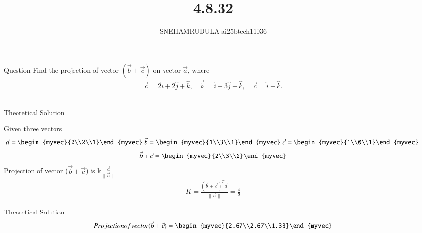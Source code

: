 \documentclass{beamer}
\title %
{4.8.32}
\author %
{SNEHAMRUDULA-ai25btech11036}
\begin{document}
\frame{\titlepage}
\begin{frame}{Question}
 Find the projection of vector $(\vec{b}+\vec{c})$ on vector $\vec{a}$, where 
\begin{align}
\vec{a} = 2\hat{i} + 2\hat{j} + \hat{k}, \quad 
\vec{b} = \hat{i} + 3\hat{j} + \hat{k}, \quad 
\vec{c} = \hat{i} + \hat{k}.
\end{align}\\ 
\end{frame}
\begin{frame}{Theoretical Solution}

Given three vectors\\
\begin{align}
\vec{a}=\begin{myvec}{2\\2\\1}\end{myvec}\
\vec{b}=\begin{myvec}{1\\3\\1}\end{myvec}\
\vec{c}=\begin{myvec}{1\\0\\1}\end{myvec}\
\end{align}
   \begin{align}
 \vec{b}+\vec{c}=\begin{myvec}{2\\3\\2}\end{myvec}
\end{align}
Projection of vector ($\vec{b}+\vec{c}$) is k$\frac{\vec{a}}{\|\vec{a}\|}$
\begin{align}
    K=\frac{(\vec{b}+\vec{c})^T\vec{a}}{\|\vec{a}\|}=\frac{4}{3}
\end{align}
\end{frame}
\begin{frame}{Theoretical Solution}
\begin{align}
Projection of vector (\vec{b}+\vec{c})=\begin{myvec}{2.67\\2.67\\1.33}\end{myvec}    
\end{align}
\end{frame}
\end{document}
